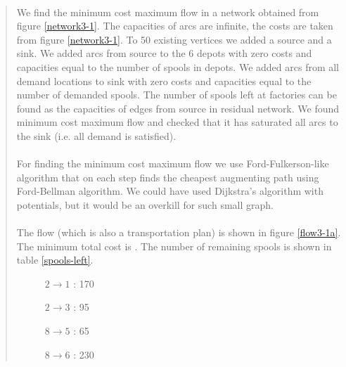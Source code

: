 \begin{quote}
\paragraph{}
We find the minimum cost maximum flow in a network obtained from figure \ref{network3-1}. The capacities of arcs are infinite, the costs are taken from figure \ref{network3-1}. To 50 existing vertices we added a source and a sink. We added arcs from source to the 6 depots with zero costs and capacities equal to the number of spools in depots. We added arcs from all demand locations to sink with zero costs and capacities equal to the number of demanded spools. The number of spools left at factories can be found as the capacities of edges from source in residual network. We found minimum cost maximum flow and checked that it has saturated all arcs to the sink (i.e. all demand is satisfied).

\paragraph{}
For finding the minimum cost maximum flow we use Ford-Fulkerson-like algorithm that on each step finds the cheapest augmenting path using Ford-Bellman algorithm. We could have used Dijkstra's algorithm with potentials, but it would be an overkill for such small graph.

\paragraph{}
The flow (which is also a transportation plan) is shown in figure \ref{flow3-1a}. The minimum total cost is . The number of remaining spools is shown in table \ref{spools-left}.

\begin{figure}[H]
\centering
\begin{multicols}{5}
$ 2 \rightarrow 1 $ : 170

$ 2 \rightarrow 3 $ : 95

$ 8 \rightarrow 5 $ : 65

$ 8 \rightarrow 6 $ : 230


\end{multicols}
\end{figure}
\end{quote}
